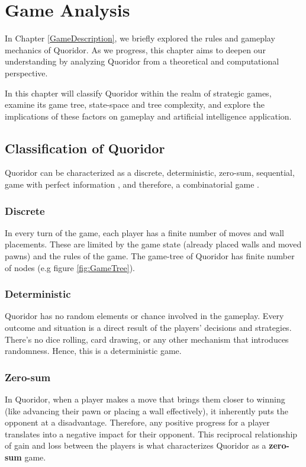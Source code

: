 \chapter{Game Analysis}

In Chapter \ref{GameDescription}, we briefly explored the rules and gameplay mechanics of Quoridor.
As we progress, this chapter aims to deepen our understanding by analyzing Quoridor from a
theoretical and computational perspective.

In this chapter will classify Quoridor within the realm of strategic games, examine its game tree,
state-space and tree complexity, and explore the implications of these factors on gameplay and
artificial intelligence application.

\section{Classification of Quoridor}

Quoridor can be characterized as a discrete, deterministic, zero-sum, sequential, game with perfect
information \citep{Glendenning2002MasteringQ} , and therefore, a combinatorial game \citep{GameTheoryBook}. 

\subsection{Discrete}
In every turn of the game, each player has a finite number of moves and wall placements. These are limited by the game state (already placed walls and moved pawns) and the rules of the game. The game-tree of Quoridor has finite number of nodes (e.g figure \ref{fig:GameTree}).

\subsection{Deterministic}
Quoridor has no random elements or chance involved in the gameplay. Every outcome and situation
is a direct result of the players' decisions and strategies. There's no dice rolling,
card drawing, or any other mechanism that introduces randomness. Hence, this is a deterministic game.

\subsection{Zero-sum}
In Quoridor, when a player makes a move that brings them closer to winning (like advancing their pawn or placing a wall effectively), it inherently puts the opponent at a disadvantage. Therefore, any positive progress for a player translates into a negative impact for their opponent. This reciprocal relationship of gain and loss between the players is what characterizes Quoridor as a \textbf{zero-sum} game.

